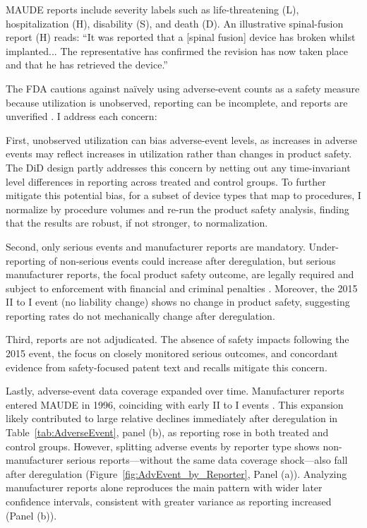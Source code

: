 \documentclass[letterpaper,12pt]{article}
\theoremstyle{definition}
\begin{document}
MAUDE reports include severity labels such as life-threatening (L), hospitalization (H), disability (S), and death (D). An illustrative spinal-fusion report (H) reads: “It was reported that a [spinal fusion] device has broken whilst implanted... The representative has confirmed the revision has now taken place and that he has retrieved the device.”



The FDA cautions against naïvely using adverse-event counts as a safety measure because utilization is unobserved, reporting can be incomplete, and reports are unverified \citep{CDRHMAUDE}. I address each concern:




First, unobserved utilization can bias adverse-event levels, as increases in adverse events may reflect increases in utilization rather than changes in product safety. The DiD design partly addresses this concern by netting out any time-invariant level differences in reporting across treated and control groups. To further mitigate this potential bias, for a subset of device types that map to procedures, I normalize by procedure volumes and re-run the product safety analysis, finding that the results are robust, if not stronger, to normalization. 

Second, only serious events and manufacturer reports are mandatory. Under-reporting of non-serious events could increase after deregulation, but serious manufacturer reports, the focal product safety outcome, are legally required and subject to enforcement with financial and criminal penalties \citep{FDAMDR2020,bragg_florence_chan_2018,emergo_2022}. Moreover, the 2015 II to I event (no liability change) shows no change in product safety, suggesting reporting rates do not mechanically change after deregulation. 


 Third, reports are not adjudicated. The absence of safety impacts following the 2015 event, the focus on closely monitored serious outcomes, and concordant evidence from safety-focused patent text and recalls mitigate this concern.



Lastly, adverse-event data coverage expanded over time. Manufacturer reports entered MAUDE in 1996, coinciding with early II to I events \citep{MAUDEprimer:2017}. This expansion likely contributed to large relative declines immediately after deregulation in Table~\ref{tab:AdverseEvent}, panel (b), as reporting rose in both treated and control groups. However, splitting adverse events by reporter type shows non-manufacturer serious reports---without the same data coverage shock---also fall after deregulation (Figure~\ref{fig:AdvEvent_by_Reporter}, Panel (a)). Analyzing manufacturer reports alone reproduces the main pattern with wider later confidence intervals, consistent with greater variance as reporting increased (Panel (b)).
\end{document}
